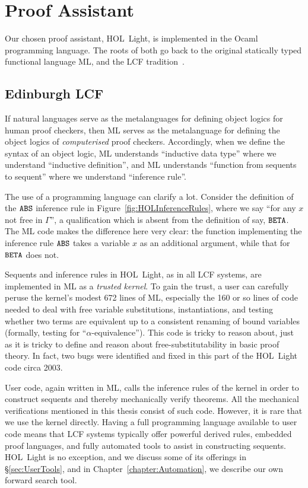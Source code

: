 \section{Proof Assistant}\label{sec:LCF}
Our chosen proof assistant, HOL~Light, is implemented in the Ocaml programming language. The roots of both go back to the original statically typed functional language ML, and the LCF tradition~\cite{LCF}.

\subsection{Edinburgh LCF}
If natural languages serve as the metalanguages for defining object logics for human proof checkers, then ML serves as the metalanguage for defining the object logics of \emph{computerised} proof checkers. Accordingly, when we define the syntax of an object logic, ML understands ``inductive data type'' where we understand ``inductive definition'', and ML understands ``function from sequents to sequent'' where we understand ``inference rule''.

The use of a programming language can clarify a lot. Consider the definition of the $\texttt{ABS}$ inference rule in Figure~\ref{fig:HOLInferenceRules}, where we say ``for any $x$ not free in $\Gamma$'', a qualification which is absent from the definition of say, $\texttt{BETA}$. The ML code makes the difference here very clear: the function implementing the inference rule $\texttt{ABS}$ takes a variable $x$ as an additional argument, while that for $\texttt{BETA}$ does not.

Sequents and inference rules in HOL~Light, as in all LCF systems, are implemented in ML as a \emph{trusted kernel}. To gain the trust, a user can carefully peruse the kernel's modest 672 lines of ML, especially the 160 or so lines of code needed to deal with free variable substitutions, instantiations, and testing whether two terms are equivalent up to a consistent renaming of bound variables (formally, testing for ``$\alpha$-equivalence''). This code is tricky to reason about, just as it is tricky to define and reason about free-substitutability in basic proof theory. In fact, two bugs were identified and fixed in this part of the HOL~Light code circa 2003.

User code, again written in ML, calls the inference rules of the kernel in order to construct sequents and thereby mechanically verify theorems. All the mechanical verifications mentioned in this thesis consist of such code. However, it is rare that we use the kernel directly. Having a full programming language available to user code means that LCF systems typically offer powerful derived rules, embedded proof languages, and fully automated tools to assist in constructing sequents. HOL~Light is no exception, and we discuss some of its offerings in \S\ref{sec:UserTools}, and in Chapter~\ref{chapter:Automation}, we describe our own forward search tool.

